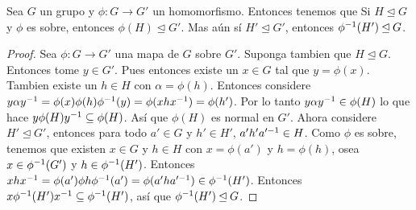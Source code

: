 \begin{lemma}\label{lemma_4.11}
    Sea $G$ un grupo y  $\phi:G \xrightarrow{} G'$ un homomorfismo. Entonces
    tenemos que Si $H \unlhd G$ y $\phi$ es sobre, entonces  $\phi(H) \unlhd G'$.
    Mas a\'un s\'i $H' \unlhd G'$, entonces $\phi^{-1}(H') \unlhd G$.
\end{lemma}
\begin{proof}
    Sea $\phi:G \xrightarrow{} G'$ una mapa de $G$ sobre  $G'$. Suponga tambien
    que  $H \unlhd G$. Entonces tome  $y \in G'$. Pues entonces existe un  $x
    \in G$ tal que  $y=\phi(x)$. Tambien existe un $h \in H$ con
    $\alpha=\phi(h)$. Entonces considere
    $y\alpha y^{-1}=\phi(x)\phi(h)\phi^{-1}(y)=\phi(xhx^{-1})=\phi(h')$. Por
    lo tanto $y\alpha y^{-1} \in \phi(H)$ lo que hace $y\phi(H)y^{-1}
    \subseteq \phi(H)$. As\'i que $\phi(H)$ es normal en $G'$.
     Ahora considere $H' \unlhd G'$, entonces para todo  $a' \in G$ y  $h' \in
     H'$,  $a'h'a'^{-1} \in H$. Como $\phi$ es sobre, tenemos que existen $x
     \in G$ y  $h \in H$ con  $x=\phi(a')$ y $h=\phi(h)$, osea $x \in
     \phi^{-1}(G')$ y $h \in \phi^{-1}(H')$. Entonces
     $xhx^{-1}=\phi(a')\phi{h}\phi^{-1}(a')=\phi(a'ha'^{-1}) \in
     \phi^{-1}(H')$. Entonces $x\phi^{-1}(H')x^{-1} \subseteq
     \phi^{-1}(H')$, as\'i que $\phi^{-1}(H')\unlhd G$.
\end{proof}

